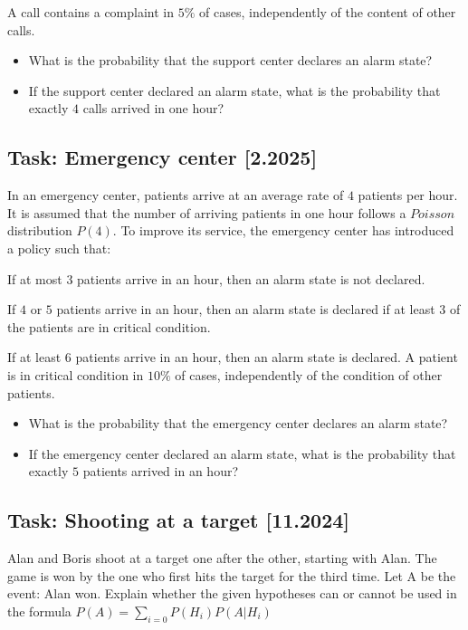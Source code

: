 \documentclass[a4paper, 12pt]{article}
\begin{document}
A call contains a complaint in $5\%$ of cases, independently of the content of other calls.

\begin{itemize}
    \item What is the probability that the support center declares an alarm state?
    \item If the support center declared an alarm state, what is the probability that exactly $4$ calls arrived in one hour?
\end{itemize}

\subsection*{Task: Emergency center [2.2025]}

In an emergency center, patients arrive at an average rate of $4$ patients per hour. It is assumed that the number of arriving patients in one hour follows a $Poisson$ distribution $P(4)$. To improve its service, the emergency center has introduced a policy such that:

If at most $3$ patients arrive in an hour, then an alarm state is not declared.

If $4$ or $5$ patients arrive in an hour, then an alarm state is declared if at least $3$ of the patients are in critical condition.

If at least $6$ patients arrive in an hour, then an alarm state is declared.
A patient is in critical condition in $10\%$ of cases, independently of the condition of other patients.

\begin{itemize}
    \item [a)] What is the probability that the emergency center declares an alarm state?
    \item [b)] If the emergency center declared an alarm state, what is the probability that exactly $5$ patients arrived in an hour?
\end{itemize}




\subsection*{Task: Shooting at a target [11.2024]}

Alan and Boris shoot at a target one after the other, starting with Alan. The game is won by the one who first hits the target for the third time. Let A be the event: Alan won. Explain whether the given hypotheses can or cannot be used in the formula $P(A)=\sum_{i=0}^{}P(H_i)P(A|H_i)$
\end{document}
